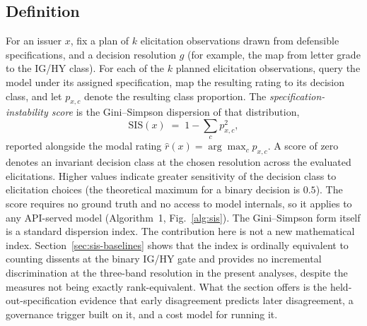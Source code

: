 \documentclass[a4paper,fleqn]{cas-sc}
\begin{document}
\subsection{Definition}
For an issuer $x$, fix a plan of $k$ elicitation observations drawn from defensible specifications, and a decision
resolution $g$ (for example, the map from letter grade to the IG/HY class). For each of the $k$ planned elicitation
observations, query the model under its assigned specification, map the resulting rating to its
decision class, and let $p_{x,c}$ denote the resulting class proportion. The \emph{specification-instability score} is the Gini--Simpson
dispersion of that distribution,
\begin{equation}
\mathrm{SIS}(x) \;=\; 1 - \sum_{c} p_{x,c}^{2},
\end{equation}
reported alongside the modal rating $\hat{r}(x)=\arg\max_c p_{x,c}$. A score of zero denotes an invariant decision class at the chosen resolution across the evaluated elicitations. Higher values indicate greater sensitivity of the decision class to elicitation choices (the theoretical maximum for a binary decision is $0.5$). The score
requires no ground truth and no access to model internals, so it applies to any API-served model
(Algorithm~1, Fig.~\ref{alg:sis}). The Gini--Simpson form itself is a standard dispersion index. The contribution here is not a new mathematical index. Section~\ref{sec:sis-baselines} shows that the index is ordinally equivalent to counting dissents at the binary IG/HY gate and provides no incremental discrimination at the three-band resolution in the present analyses, despite the measures not being exactly rank-equivalent. What the section offers is the
held-out-specification evidence that early disagreement predicts later disagreement, a governance
trigger built on it, and a cost model for running it.
\end{document}
